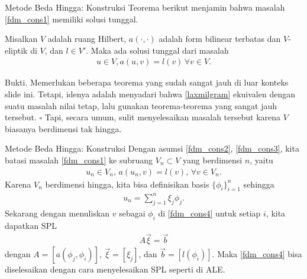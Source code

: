 \documentclass[xcolor={dvipsnames}, 9pt]{beamer}
\begin{document}
	\begin{frame}{Metode Beda Hingga: Konstruksi}
		Teorema berikut menjamin bahwa masalah \eqref{fdm_cons1} memiliki solusi tunggal. 
		\begin{theorem}
			Misalkan $V$ adalah ruang Hilbert, $a(\cdot,\cdot)$ adalah form bilinear terbatas dan $V$-eliptik di $V$, dan $l\in V'$. Maka ada solusi tunggal dari masalah
			\begin{align}\label{laxmilgram}
				u\in V, a(u,v)=l(v) \, \forall v\in V.
			\end{align}
		\end{theorem}
		Bukti. Memerlukan beberapa teorema yang sudah sangat jauh di luar konteks slide ini. Tetapi, idenya adalah menyadari bahwa \eqref{laxmilgram} ekuivalen dengan suatu masalah nilai tetap, lalu gunakan teorema-teorema yang sangat jauh tersebut. $\square$ \newline
		Tapi, secara umum, sulit menyelesaikan masalah tersebut karena $V$ biasanya berdimensi tak hingga.
	\end{frame}
	\begin{frame}{Metode Beda Hingga: Konstruksi}
		Dengan asumsi \eqref{fdm_cons2}, \eqref{fdm_cons3}, kita batasi masalah \eqref{fdm_cons1} ke subruang $V_n\subset V$ yang berdimensi $n$, yaitu
		\begin{align}\label{fdm_cons4}
			u_n\in V_n, \, a(u_n, v) = l(v), \, \forall v\in V_n.
		\end{align}
		Karena $V_n$ berdimensi hingga, kita bisa definisikan basis $\{\phi_i\}_{i=1}^n$ sehingga
		\begin{align*}
			u_n = \sum_{j=1}^{n} \xi_j\phi_j.
		\end{align*}
		Sekarang dengan menuliskan $v$ sebagai $\phi_i$ di \eqref{fdm_cons4} untuk setiap $i$, kita dapatkan SPL
		\begin{align}
			A\vec{\xi} = \vec{b}
		\end{align}
		dengan $A = [a(\phi_j,\phi_i)]$, $\vec{\xi} = [\xi_j]$, dan $\vec{b} = [l(\phi_i)]$. Maka \eqref{fdm_cons4} bisa diselesaikan dengan cara menyelesaikan SPL seperti di ALE.
	\end{frame}
\end{document}
